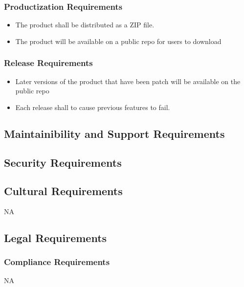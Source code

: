 \documentclass[12pt]{article}
\begin{document}
\subsubsection{Productization Requirements}
\begin{itemize}
	\item The product shall be distributed as a ZIP file.
	\item The product will be available on a public repo for users to download
\end{itemize}

\subsubsection{Release Requirements}
\begin{itemize}
	\item Later versions of the product that have been patch will be available on the public repo
	\item Each release shall to cause previous features to fail.
\end{itemize}

\subsection{Maintainibility and Support Requirements} %

\subsection{Security Requirements} %

\subsection{Cultural Requirements} %
NA

\subsection{Legal Requirements} %
\subsubsection{Compliance Requirements}
NA
\end{document}
